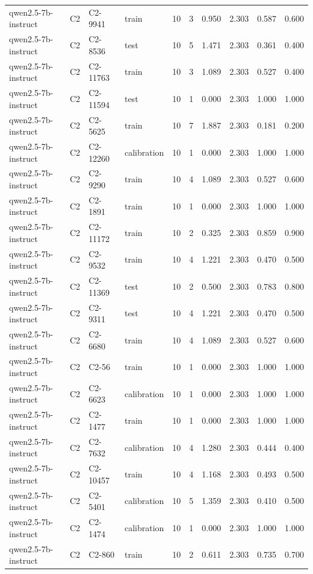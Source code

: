 \begin{table}
\begin{tabular}{llllrrrrrr}
qwen2.5-7b-instruct & C2 & C2-9941 & train & 10 & 3 & 0.950 & 2.303 & 0.587 & 0.600 \\
qwen2.5-7b-instruct & C2 & C2-8536 & test & 10 & 5 & 1.471 & 2.303 & 0.361 & 0.400 \\
qwen2.5-7b-instruct & C2 & C2-11763 & train & 10 & 3 & 1.089 & 2.303 & 0.527 & 0.400 \\
qwen2.5-7b-instruct & C2 & C2-11594 & test & 10 & 1 & 0.000 & 2.303 & 1.000 & 1.000 \\
qwen2.5-7b-instruct & C2 & C2-5625 & train & 10 & 7 & 1.887 & 2.303 & 0.181 & 0.200 \\
qwen2.5-7b-instruct & C2 & C2-12260 & calibration & 10 & 1 & 0.000 & 2.303 & 1.000 & 1.000 \\
qwen2.5-7b-instruct & C2 & C2-9290 & train & 10 & 4 & 1.089 & 2.303 & 0.527 & 0.600 \\
qwen2.5-7b-instruct & C2 & C2-1891 & train & 10 & 1 & 0.000 & 2.303 & 1.000 & 1.000 \\
qwen2.5-7b-instruct & C2 & C2-11172 & train & 10 & 2 & 0.325 & 2.303 & 0.859 & 0.900 \\
qwen2.5-7b-instruct & C2 & C2-9532 & train & 10 & 4 & 1.221 & 2.303 & 0.470 & 0.500 \\
qwen2.5-7b-instruct & C2 & C2-11369 & test & 10 & 2 & 0.500 & 2.303 & 0.783 & 0.800 \\
qwen2.5-7b-instruct & C2 & C2-9311 & test & 10 & 4 & 1.221 & 2.303 & 0.470 & 0.500 \\
qwen2.5-7b-instruct & C2 & C2-6680 & train & 10 & 4 & 1.089 & 2.303 & 0.527 & 0.600 \\
qwen2.5-7b-instruct & C2 & C2-56 & train & 10 & 1 & 0.000 & 2.303 & 1.000 & 1.000 \\
qwen2.5-7b-instruct & C2 & C2-6623 & calibration & 10 & 1 & 0.000 & 2.303 & 1.000 & 1.000 \\
qwen2.5-7b-instruct & C2 & C2-1477 & train & 10 & 1 & 0.000 & 2.303 & 1.000 & 1.000 \\
qwen2.5-7b-instruct & C2 & C2-7632 & calibration & 10 & 4 & 1.280 & 2.303 & 0.444 & 0.400 \\
qwen2.5-7b-instruct & C2 & C2-10457 & train & 10 & 4 & 1.168 & 2.303 & 0.493 & 0.500 \\
qwen2.5-7b-instruct & C2 & C2-5401 & calibration & 10 & 5 & 1.359 & 2.303 & 0.410 & 0.500 \\
qwen2.5-7b-instruct & C2 & C2-1474 & calibration & 10 & 1 & 0.000 & 2.303 & 1.000 & 1.000 \\
qwen2.5-7b-instruct & C2 & C2-860 & train & 10 & 2 & 0.611 & 2.303 & 0.735 & 0.700 \\

\end{tabular}
\end{table}
